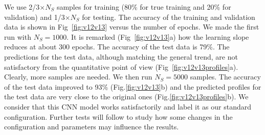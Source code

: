 \documentclass{iucr}
\begin{document}
 We use 2/3$\times N_S$ samples for training (80\% for true training and 20\% for validation) and 1/3$\times N_S$ for testing. The accuracy of the training and validation data is shown in Fig~\ref{fig:v12v13} versus the number of epochs.
 We made the first run with $N_S=1000$.
 It is remarked (Fig~\ref{fig:v12v13}a) how the learning slope reduces at about 300 epochs. The accuracy of the test data is 79\%. The predictions for the test data, although matching the general trend, are not satisfactory from the quantitative point of view (Fig~\ref{fig:v12v13profiles}a). 
 Clearly, more samples are needed. We then run $N_S=5000$ samples. The accuracy of the test data improved to 93\% (Fig.\ref{fig:v12v13}b) and the predicted profiles for the test data are very close to the original ones (Fig.\ref{fig:v12v13profiles}b). We consider that this CNN model works satisfactorily and label it as our standard configuration. Further tests will follow to study how some changes in the configuration and parameters may influence the results.
\end{document}
